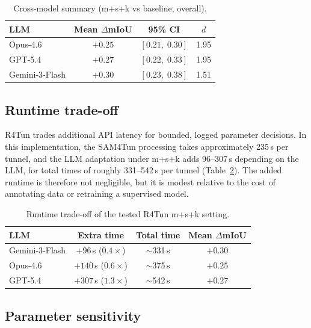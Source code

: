 \documentclass[a4paper,fleqn]{cas-dc}
\begin{document}
{\begin{table}[ht]
\caption{Cross-model summary (m+s+k vs baseline, overall).}\label{tab:cross-model}
\begin{tabular*}{\tblwidth}{@{} l c c c @{}}
\toprule
LLM & Mean $\Delta$mIoU & 95\% CI & \mbox{$d$} \\
\midrule
Opus-4.6 & $+0.25$ & $[0.21,\; 0.30]$ & 1.95 \\
GPT-5.4 & $+0.27$ & $[0.22,\; 0.33]$ & 1.95 \\
Gemini-3-Flash & $+0.30$ & $[0.23,\; 0.38]$ & 1.51 \\
\bottomrule
\end{tabular*}
\end{table}

\subsection{Runtime trade-off}\label{sec:runtime-tradeoff}

R4Tun trades additional API latency for bounded, logged parameter decisions. In this implementation, the SAM4Tun processing takes approximately 235\,s per tunnel, and the LLM adaptation under m+s+k adds 96--307\,s depending on the LLM, for total times of roughly 331--542\,s per tunnel (Table~\ref{tab:runtime-tradeoff}). The added runtime is therefore not negligible, but it is modest relative to the cost of annotating data or retraining a supervised model.

\begin{table}[ht]
\caption{Runtime trade-off of the tested R4Tun m+s+k setting.}\label{tab:runtime-tradeoff}
\begin{tabular*}{\tblwidth}{@{} l c c c @{}}
\toprule
LLM & Extra time & Total time & Mean $\Delta$mIoU \\
\midrule
Gemini-3-Flash & $+96$\,s ($0.4\times$) & $\sim$331\,s & $+0.30$ \\
Opus-4.6 & $+140$\,s ($0.6\times$) & $\sim$375\,s & $+0.25$ \\
GPT-5.4 & $+307$\,s ($1.3\times$) & $\sim$542\,s & $+0.27$ \\
\bottomrule
\end{tabular*}
\end{table}

\subsection{Parameter sensitivity}\label{sec:sensitivity}

}
\end{document}
